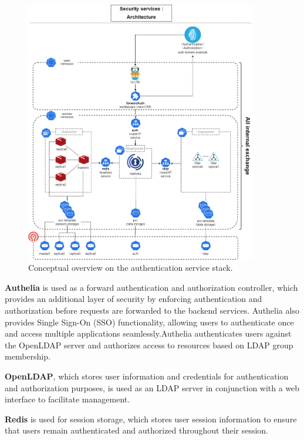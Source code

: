 \begin{figure}[H]\centering
\includegraphics[width=0.9\textwidth,angle=00]{assets/f51.png}
\caption{Conceptual overview on the authentication service stack. }
\label{fig:f51}
\end{figure} 

\hspace{7mm}\textbf{Authelia} is used as a forward authentication and authorization controller, which provides an additional layer of security by enforcing authentication and authorization before requests are forwarded to the backend services. Authelia also provides Single Sign-On (SSO) functionality, allowing users to authenticate once and access multiple applications seamlessly.Authelia authenticates users against the OpenLDAP server and authorizes access to resources based on LDAP group membership.  

\hspace{7mm}\textbf{OpenLDAP}, which stores user information and credentials for authentication and authorization purposes, is used as an LDAP server in conjunction with a web interface to facilitate management. 

\hspace{7mm}\textbf{Redis} is used for session storage, which stores user session information to ensure that users remain authenticated and authorized throughout their session. 

